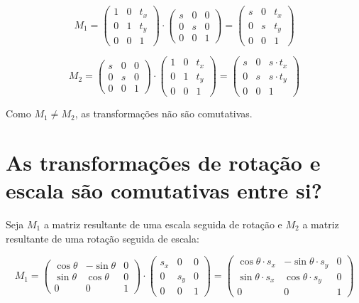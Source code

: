\documentclass{article}
\begin{document}
$$M_1 = \begin{pmatrix}
		1 & 0 & t_x\\
		0 & 1 & t_y\\
		0 & 0 & 1
\end{pmatrix}
\cdot
	\begin{pmatrix}
		s & 0 & 0\\
		0 & s & 0\\
		0 & 0 & 1
	\end{pmatrix}
=
\begin{pmatrix}
	s & 0 & t_x\\
	0 & s & t_y\\
	0 & 0 & 1
\end{pmatrix}
$$

$$M_2 = \begin{pmatrix}
	s & 0 & 0\\
	0 & s & 0\\
	0 & 0 & 1
\end{pmatrix}
\cdot
\begin{pmatrix}
	1 & 0 & t_x\\
	0 & 1 & t_y\\
	0 & 0 & 1
\end{pmatrix}
=
\begin{pmatrix}
	s & 0 & s \cdot t_x\\
	0 & s & s \cdot t_y\\
	0 & 0 & 1
\end{pmatrix}
$$

Como $M_1 \neq M_2$, as transformações não são comutativas.

\section{As transformações de rotação e escala são comutativas entre si?}

Seja $M_1$ a matriz resultante de uma escala seguida de rotação e $M_2$ a matriz resultante de uma rotação seguida de escala:

$$M_1 = \begin{pmatrix}
	\cos\theta & -\sin\theta & 0\\
	\sin\theta & \cos\theta & 0\\
	0 & 0 & 1
\end{pmatrix} \cdot \begin{pmatrix}
s_x & 0 & 0\\
0 & s_y & 0\\
0 & 0 & 1
\end{pmatrix} = \begin{pmatrix}
\cos\theta \cdot s_x & -\sin\theta \cdot s_y & 0\\
\sin\theta \cdot s_x & \cos\theta \cdot s_y & 0\\
0 & 0 & 1
\end{pmatrix}$$
\end{document}
